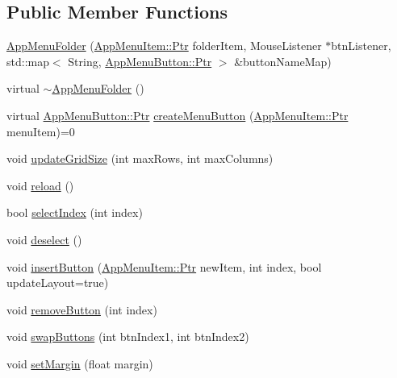 \subsection*{Public Member Functions}
\begin{DoxyCompactItemize}
\item 
\mbox{\hyperlink{classAppMenuFolder_aaae331efa5ffc31442662b1c4b61bed1}{App\+Menu\+Folder}} (\mbox{\hyperlink{classAppMenuItem_ab5f51c5d74f8df62b8862c0cc8126cb7}{App\+Menu\+Item\+::\+Ptr}} folder\+Item, Mouse\+Listener $\ast$btn\+Listener, std\+::map$<$ String, \mbox{\hyperlink{classAppMenuButton_aeb692efb6a933970de8eac14e5e71544}{App\+Menu\+Button\+::\+Ptr}} $>$ \&button\+Name\+Map)
\item 
virtual \mbox{\hyperlink{classAppMenuFolder_a613c59dfbdfeb7de2334d1d1b35df003}{$\sim$\+App\+Menu\+Folder}} ()
\item 
virtual \mbox{\hyperlink{classAppMenuButton_aeb692efb6a933970de8eac14e5e71544}{App\+Menu\+Button\+::\+Ptr}} \mbox{\hyperlink{classAppMenuFolder_a001ecdee13bf394746b5d0b49dcc55cc}{create\+Menu\+Button}} (\mbox{\hyperlink{classAppMenuItem_ab5f51c5d74f8df62b8862c0cc8126cb7}{App\+Menu\+Item\+::\+Ptr}} menu\+Item)=0
\item 
void \mbox{\hyperlink{classAppMenuFolder_a08ce81a26455064b8aa04f21e71ca964}{update\+Grid\+Size}} (int max\+Rows, int max\+Columns)
\item 
void \mbox{\hyperlink{classAppMenuFolder_a40f5278d08ce32cbbb978fc03d5cdaf9}{reload}} ()
\item 
bool \mbox{\hyperlink{classAppMenuFolder_abee7d3028394ad270be8d61b28d8c142}{select\+Index}} (int index)
\item 
void \mbox{\hyperlink{classAppMenuFolder_aa57adc20320fbce0bdfcbe9489394db4}{deselect}} ()
\item 
void \mbox{\hyperlink{classAppMenuFolder_a1a87de8b490dac5d26afca1947c70708}{insert\+Button}} (\mbox{\hyperlink{classAppMenuItem_ab5f51c5d74f8df62b8862c0cc8126cb7}{App\+Menu\+Item\+::\+Ptr}} new\+Item, int index, bool update\+Layout=true)
\item 
void \mbox{\hyperlink{classAppMenuFolder_aa913b3513e67ab46e7501018560d7930}{remove\+Button}} (int index)
\item 
void \mbox{\hyperlink{classAppMenuFolder_a67d962bcf083e0d1c9de2b467bcf7f30}{swap\+Buttons}} (int btn\+Index1, int btn\+Index2)
\item 
void \mbox{\hyperlink{classAppMenuFolder_aebb29350a1146a14e4e24e3c3def5577}{set\+Margin}} (float margin)
\item 

\end{DoxyCompactItemize}
